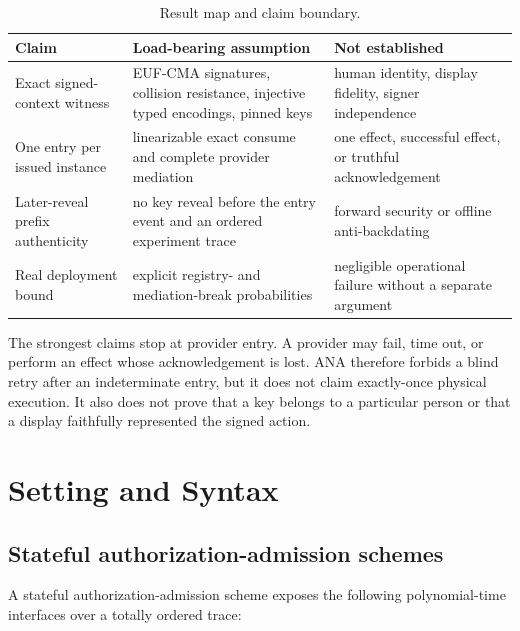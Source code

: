 \documentclass[10pt]{article}
\begin{document}
\begin{table}[ht]
\centering
\caption{Result map and claim boundary.}
\label{tab:result-map}
\small
\begin{tabularx}{\textwidth}{@{}>{\raggedright\arraybackslash}p{}>{\raggedright\arraybackslash}p{}>{\raggedright\arraybackslash}X@{}}
\toprule
Claim & Load-bearing assumption & Not established \\
\midrule
Exact signed-context witness & EUF-CMA signatures, collision resistance, injective typed encodings, pinned keys & human identity, display fidelity, signer independence \\
One entry per issued instance & linearizable exact consume and complete provider mediation & one effect, successful effect, or truthful acknowledgement \\
Later-reveal prefix authenticity & no key reveal before the entry event and an ordered experiment trace & forward security or offline anti-backdating \\
Real deployment bound & explicit registry- and mediation-break probabilities & negligible operational failure without a separate argument \\
\bottomrule
\end{tabularx}
\normalsize
\end{table}

The strongest claims stop at provider entry. A provider may fail, time out, or
perform an effect whose acknowledgement is lost. ANA therefore forbids a blind
retry after an indeterminate entry, but it does not claim exactly-once physical
execution. It also does not prove that a key belongs to a particular person or
that a display faithfully represented the signed action.

\section{Setting and Syntax}
\label{sec:syntax}

\subsection{Stateful authorization-admission schemes}

A stateful authorization-admission scheme exposes the following polynomial-time
interfaces over a totally ordered trace:
\end{document}
